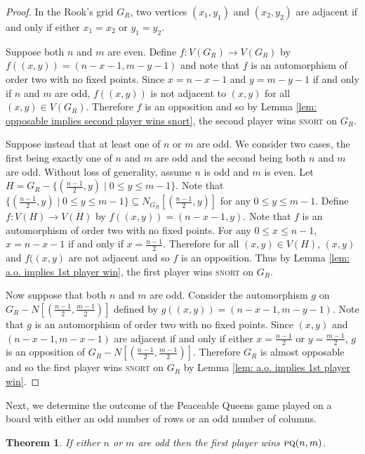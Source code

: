 \documentclass[11pt]{article}
\newtheorem{theorem}{Theorem}[section]
\theoremstyle{definition}
\begin{document}
\begin{proof}
    In the Rook's grid $G_R$, two vertices $(x_1, y_1)$ and $(x_2, y_2)$ are
    adjacent if and only if either $x_1 = x_2$ or $y_1 = y_2$. 

    Suppose both $n$ and $m$ are even. Define $f:V(G_R) \to V(G_R)$ by
    $f((x,y)) = (n-x-1, m-y-1)$ and note that $f$ is an automorphism of order
    two with no fixed points. Since $x=n-x-1$ and $y=m-y-1$ if and only if $n$
    and $m$ are odd, $f((x,y))$ is not adjacent to $(x,y)$ for all $(x,y) \in
    V(G_R)$. Therefore $f$ is an opposition and so by Lemma \ref{lem: opposable
    implies second player wins snort}, the second player wins \textsc{snort} on
    $G_R$. 

    Suppose instead that at least one of $n$ or $m$ are odd. We consider two
    cases, the first being exactly one of $n$ and $m$ are odd and the second
    being both $n$ and $m$ are odd. Without loss of generality, assume $n$ is
    odd and $m$ is even. Let $H = G_R - \{(\frac{n-1}{2}, y) \mid 0\leq y\leq
    m-1\}$. Note that $\{(\frac{n-1}{2}, y) \mid 0\leq y\leq m-1\} \subseteq
    N_{G_R}[(\frac{n-1}{2}, y)]$ for any $0\leq y\leq m-1$. Define $f:V(H) \to
    V(H)$ by $f((x,y)) = (n-x-1, y)$. Note that $f$ is an automorphism of order
    two with no fixed points. For any $0\leq x\leq n-1$, $x=n-x-1$ if and only
    if $x= \frac{n-1}{2}$. Therefore for all $(x,y) \in V(H)$, $(x,y)$ and
    $f((x,y)$ are not adjacent and so $f$ is an opposition. Thus by Lemma
    \ref{lem: a.o. implies 1st player win}, the first player wins
    \textsc{snort} on $G_R$. 

    Now suppose that both $n$ and $m$ are odd. Consider the automorphism $g$ on
    $G_R - N[(\frac{n-1}{2}, \frac{m-1}{2})]$ defined by $g((x,y)) = (n-x-1,
    m-y-1)$. Note that $g$ is an automorphism of order two with no fixed
    points. Since $(x,y)$ and $(n-x-1, m-x-1)$ are adjacent if and only if
    either $x= \frac{n-1}{2}$ or $y=\frac{m-1}{2}$, $g$ is an opposition of
    $G_R - N[(\frac{n-1}{2}, \frac{m-1}{2})]$. Therefore $G_R$ is almost
    opposable and so the first player wins \textsc{snort} on $G_R$ by Lemma
    \ref{lem: a.o. implies 1st player win}.
\end{proof}

Next, we determine the outcome of the Peaceable Queens game played on a board
with either an odd number of rows or an odd number of columns. 

\begin{theorem}
    \label{thm: PQ outcomes for odd x m boards}
    If either $n$ or $m$ are odd then the first player wins $\textsc{pq}(n,m)$.
\end{theorem}
\end{document}
